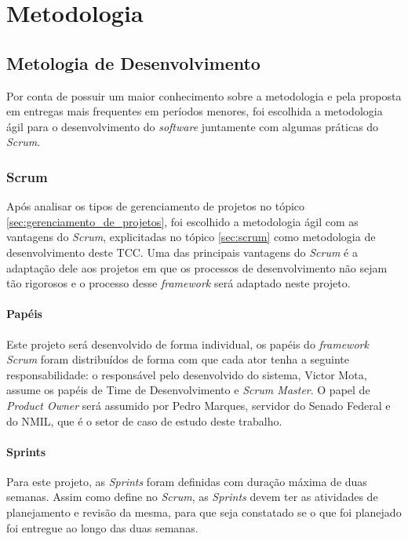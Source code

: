 \chapter[Metodologia]{Metodologia}
\label{cp:metodologia}

\section{Metologia de Desenvolvimento}

Por conta de possuir um maior conhecimento sobre a metodologia e pela proposta em entregas mais frequentes em períodos menores, foi escolhida a metodologia ágil para o desenvolvimento do \textit{software} juntamente com algumas práticas do \textit{Scrum}. 

\subsection{Scrum}

Após analisar os tipos de gerenciamento de projetos no tópico \ref{sec:gerenciamento_de_projetos}, foi escolhido a metodologia ágil com as vantagens do \textit{Scrum}, explicitadas no tópico \ref{sec:scrum} como metodologia de desenvolvimento deste TCC. Uma das principais vantagens do \textit{Scrum} é a adaptação dele aos projetos em que os processos de desenvolvimento não sejam tão rigorosos e o processo desse \textit{framework} será adaptado neste projeto.

\subsubsection{Papéis}

Este projeto será desenvolvido de forma individual, os papéis do \textit{framework} \textit{Scrum} foram distribuídos de forma com que cada ator tenha a seguinte responsabilidade: o responsável pelo desenvolvido do sistema, Victor Mota, assume os papéis de Time de Desenvolvimento e \textit{Scrum Master}. O papel de \textit{Product Owner} será assumido por Pedro Marques, servidor do Senado Federal e do NMIL, que é o setor de caso de estudo deste trabalho. 

\subsubsection{Sprints}

Para este projeto, as \textit{Sprints} foram definidas com duração máxima de duas semanas. Assim como define no \textit{Scrum}, as \textit{Sprints} devem ter as atividades de planejamento e revisão da mesma, para que seja constatado se o que foi planejado foi entregue ao longo das duas semanas.

